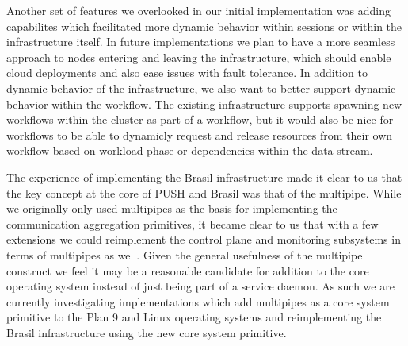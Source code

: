 Another set of features we overlooked in our initial 
implementation was adding capabilites which facilitated
more dynamic behavior within sessions or within the
infrastructure itself.  In future implementations we
plan to have a more seamless approach to nodes entering
and leaving the infrastructure, which should enable
cloud deployments and also ease issues with fault tolerance.
In addition to dynamic behavior of the infrastructure, we
also want to better support dynamic behavior within the
workflow.  The existing infrastructure supports spawning
new workflows within the cluster as part of a workflow,
but it would also be nice for workflows to be able to
dynamicly request and release resources from their own
workflow based on workload phase or dependencies
within the data stream.

The experience of implementing the Brasil infrastructure
made it clear to us that the key concept at the core
of PUSH and Brasil was that of the multipipe.  While we
originally only used multipipes as the basis for implementing the
communication aggregation primitives, it became clear to
us that with a few extensions  we could reimplement the 
control plane and monitoring subsystems in terms of 
multipipes as well.  Given the general usefulness of
the multipipe construct we feel it may be a reasonable
candidate for addition to the core operating system 
instead of just being part of a service daemon.  As
such we are currently investigating implementations which
add multipipes as a core system primitive to the Plan 9
and Linux operating systems and reimplementing the Brasil
infrastructure using the new core system primitive.
